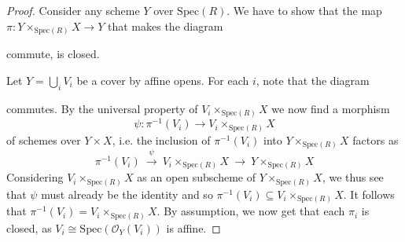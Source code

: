 \documentclass{scrartcl}
\newcommand{\Spec}{\mathrm{Spec}}
\renewcommand{\O}{\mathcal{O}}
\newcommand\restr[2]{{
    \left.\kern-\nulldelimiterspace
    #1
    \vphantom{\big|}
    \right|_{#2}
}}
\theoremstyle{definition}
\begin{document}
\begin{proof}
    Consider any scheme $Y$ over $\Spec(R)$.
    We have to show that the map $\pi: Y \times_{\Spec(R)} X \to Y$ that makes the diagram
    \begin{center}
    \end{center}
    commute, is closed.

    Let $Y = \bigcup_i V_i$ be a cover by affine opens.
    For each $i$, note that the diagram
    \begin{center}
    \end{center}
    commutes.
    By the universal property of $V_i \times_{\Spec(R)} X$ we now find a morphism
    \begin{equation*}
        \psi: \pi^{-1}(V_i) \to V_i \times_{\Spec(R)} X
    \end{equation*}
    of schemes over $Y \times X$, i.e. the inclusion of $\pi^{-1}(V_i)$ into $Y \times_{\Spec(R)} X$ factors as
    \begin{equation*}
        \pi^{-1}(V_i) \ \overset{\psi}{\to} \ V_i \times_{\Spec(R)} X \ \to \ Y \times_{\Spec(R)} X
    \end{equation*}
    Considering $V_i \times_{\Spec(R)} X$ as an open subscheme of $Y \times_{\Spec(R)} X$, we thus see that $\psi$ must already be the identity and so $\pi^{-1}(V_i) \subseteq V_i \times_{\Spec(R)} X$.
    It follows that $\pi^{-1}(V_i) = V_i \times_{\Spec(R)} X$.
    By assumption, we now get that each $\pi_i$ is closed, as $V_i \cong \Spec(\O_Y(V_i))$ is affine.


\end{proof}
\end{document}
